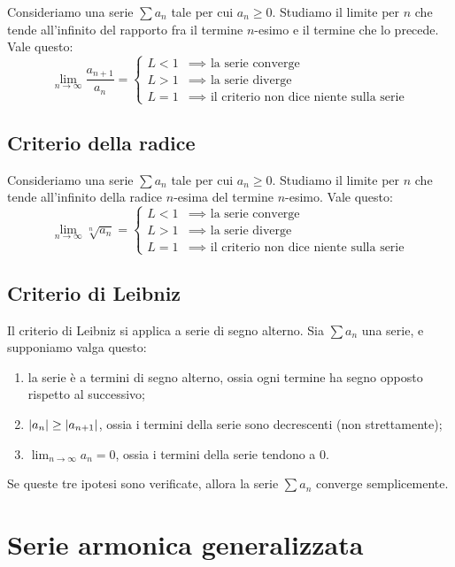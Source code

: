 Consideriamo una serie $\sum a_n$ tale per cui $a_n \ge 0$. Studiamo il 
limite per $n$ che tende all'infinito del rapporto fra il termine $n$-esimo
e il termine che lo precede. Vale questo:
\[
\lim_{n \to \infty} \frac{a_{n+1}}{a_n} =
\begin{cases}
L < 1 &\implies \text{ la serie converge} \\
L > 1 &\implies \text{ la serie diverge} \\
L = 1 &\implies \text{ il criterio non dice niente sulla serie}
\end{cases}
\]

\subsection{Criterio della radice}

Consideriamo una serie $\sum a_n$ tale per cui $a_n \ge 0$. Studiamo il 
limite per $n$ che tende all'infinito della radice $n$-esima del termine
$n$-esimo. Vale questo:
\[
\lim_{n \to \infty} \sqrt[n]{a_n} =
\begin{cases}
L < 1 &\implies \text{ la serie converge} \\
L > 1 &\implies \text{ la serie diverge} \\
L = 1 &\implies \text{ il criterio non dice niente sulla serie}
\end{cases}
\]

\subsection{Criterio di Leibniz}

Il criterio di Leibniz si applica a serie di segno alterno.
Sia $\sum a_n$ una serie, e supponiamo valga questo:
\begin{enumerate}
    \item la serie \`e a termini di segno alterno, ossia ogni termine
    ha segno opposto rispetto al successivo;
    \item $\left\lvert{a_n}\right\rvert \ge \left\lvert{a_{n+1}}\right\rvert$, ossia i termini della serie
    sono decrescenti (non strettamente);
    \item $\lim_{n \to \infty} a_n = 0$, ossia i termini della serie 
    tendono a 0.
\end{enumerate}
Se queste tre ipotesi sono verificate, allora la serie $\sum a_n$ converge
semplicemente.

\section{Serie armonica generalizzata}

